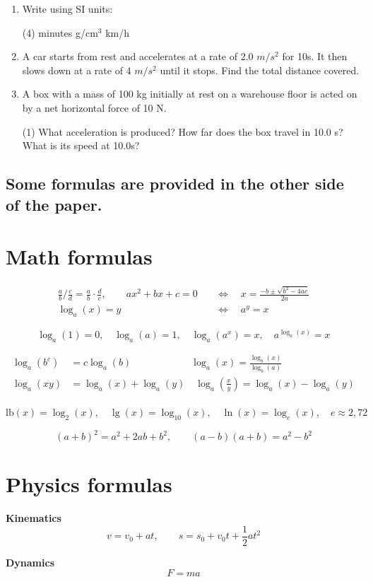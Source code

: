 \documentclass[12pt]{article}
\begin{document}
\begin{enumerate}
\item Write using SI units:
    \begin{tasks}(4)
         minutes
         g/cm$^3$
         km/h
    \end{tasks}

\item A car starts from rest and accelerates at a rate of 2.0 $m/s^2$ for 10s. 
It then slows down at a rate of 4 $m/s^2$ until it stops. 
Find the total distance covered.


\item A box with a mass of 100 kg initially at rest on a warehouse floor is acted on by a net horizontal force of 10 N. 
    \begin{tasks}(1)
        \task What acceleration is produced? 
        \task How far does the box travel in 10.0 s?
        \task What is its speed at 10.0s?
    \end{tasks}


\end{enumerate}

\subsection*{Some formulas are provided in the other side of the paper.}

\newpage

\section*{Math formulas}

\begin{equation*}
\begin{split}
\frac{a}{b}\bigg/\frac{c}{d}
=\frac{a}{b}\cdot\frac{d}{c},\qquad
ax^2+bx+c=0\quad&\Leftrightarrow\quad x=\frac{-b\pm\sqrt{b^2-4ac}}{2a}\\[2mm]
\log_a(x)=y\quad&\Leftrightarrow\quad a^y=x
\end{split}
\end{equation*}


$$
\log_a(1)=0,\quad
\log_a(a)=1,\quad
\log_a(a^x)=x,\quad
a^{\log_a(x)}=x
$$

\begin{equation*}
\begin{split}
\log_a(b^c)&=c\log_a(b)
\qquad\qquad\qquad \log_a(x)=\frac{\log_b(x)}{\log_b(a)}\\
\log_a(xy)&=\log_a(x)+\log_a(y)
\quad \log_a\left(\frac{x}{y}\right)
=\log_a(x)-\log_a(y)\\
\end{split}
\end{equation*}

$$
\textrm{lb}(x)=\log_2(x),\quad
\lg(x)=\log_{10}(x),\quad
\ln(x)=\log_e(x),\quad
e\approx 2,72
$$

$$
(a+b)^2=a^2+2ab+b^2,\qquad
(a-b)(a+b)=a^2-b^2
$$

\section*{Physics formulas}




\textbf{Kinematics}
$$
v = v_0 + at,\qquad
s = s_0 + v_0t+\frac{1}{2}at^2
$$

\textbf{Dynamics}
$$
F = ma
$$
\end{document}
